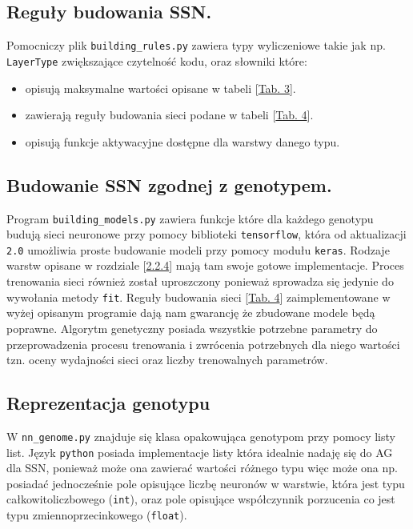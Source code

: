 \documentclass{article}
\begin{document}
\subsection{Reguły budowania SSN.}
Pomocniczy plik \texttt{building\_rules.py} zawiera typy wyliczeniowe takie jak np.
\texttt{LayerType} zwiększające czytelność kodu, oraz słowniki które:
\begin{itemize}
\item opisują maksymalne wartości opisane w tabeli [\hyperref[tab:zakres]{Tab. 3}].
\item zawierają reguły budowania sieci podane w tabeli [\hyperref[tab:rules]{Tab. 4}].
\item opisują funkcje aktywacyjne dostępne dla warstwy danego typu.
\end{itemize}

\subsection{Budowanie SSN zgodnej z genotypem.}
Program \texttt{building\_models.py} zawiera funkcje które dla każdego genotypu budują sieci neuronowe 
przy pomocy biblioteki \texttt{tensorflow}, która od aktualizacji \texttt{2.0}
umożliwia proste budowanie modeli przy pomocy modułu \texttt{keras}\cite{keras}.  
Rodzaje warstw opisane w rozdziale [\hyperref[sec:warstwy]{2.2.4}] mają tam swoje gotowe
implementacje. Proces trenowania sieci również został uproszczony ponieważ 
sprowadza się jedynie do wywołania metody \texttt{fit}.
Reguły budowania sieci [\hyperref[tab:rules]{Tab. 4}] zaimplementowane w wyżej opisanym 
programie dają nam gwarancję że zbudowane modele  będą poprawne.
Algorytm genetyczny posiada wszystkie
potrzebne parametry do przeprowadzenia procesu trenowania i zwrócenia potrzebnych dla niego
wartości tzn. oceny wydajności sieci oraz liczby trenowalnych parametrów.

\subsection{Reprezentacja genotypu}
W \texttt{nn\_genome.py} znajduje się klasa opakowująca genotypom przy pomocy listy list.
Język \texttt{python} posiada implementacje listy która idealnie nadaję się do AG dla SSN, 
ponieważ może ona zawierać wartości różnego typu więc może ona np. posiadać jednocześnie
pole opisujące liczbę neuronów w warstwie, która jest typu całkowitoliczbowego (\texttt{int}),
oraz pole opisujące współczynnik porzucenia co jest typu zmiennoprzecinkowego 
(\texttt{float}).
\end{document}
